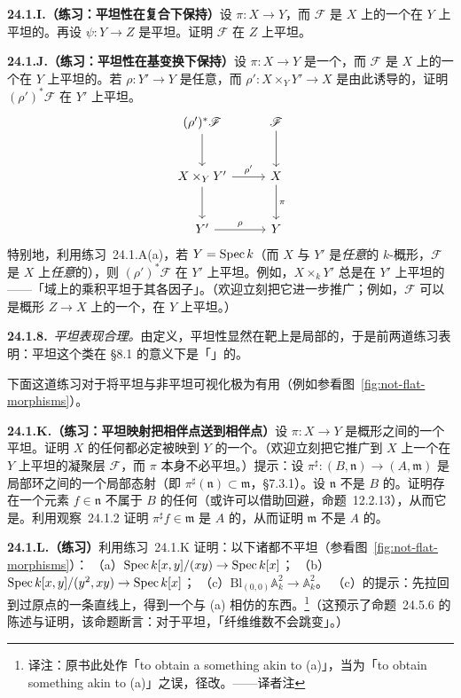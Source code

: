 \textbf{24.1.I.（练习：平坦性在复合下保持）}\quad 设 $\pi\colon X\to Y$，而 $\mathscr{F}$ 是 $X$ 上的一个在 $Y$ 上平坦的\trQCSheaf。再设 $\psi\colon Y\to Z$ 是平坦\trMorphism。证明 $\mathscr{F}$ 在 $Z$ 上平坦。

\textbf{24.1.J.（练习：平坦性在基变换下保持）}\quad 设 $\pi\colon X\to Y$ 是一个\trMorphism，而 $\mathscr{F}$ 是 $X$ 上的一个在 $Y$ 上平坦的\trQCSheaf。若 $\rho\colon Y'\to Y$ 是任意\trMorphism，而 $\rho'\colon X\times_Y Y'\to X$ 是由此诱导的\trMorphism，证明 $(\rho')^{*}\mathscr{F}$ 在 $Y'$ 上平坦。
\[
\begin{tikzcd}[row sep=2.6em, column sep=2.6em]
(\rho')^{*}\mathscr{F} \ar[d] & \mathscr{F} \ar[d] \\
X\times_Y Y' \ar[r, "\rho'"] \ar[d] & X \ar[d, "\pi"] \\
Y' \ar[r, "\rho"] & Y
\end{tikzcd}
\]
特别地，利用\mbox{练习~24.1.A}(a)，若 $Y=\operatorname{Spec} k$（而 $X$ 与 $Y'$ 是\emph{任意}的 $k$-概形，$\mathscr{F}$ 是 $X$ 上\emph{任意}的\trQCSheaf），则 $(\rho')^{*}\mathscr{F}$ 在 $Y'$ 上平坦。例如，$X\times_k Y'$ 总是在 $Y'$ 上平坦的——「域上的乘积平坦于其各因子」。（欢迎立刻把它进一步推广；例如，$\mathscr{F}$ 可以是概形 $Z\to X$ 上的一个\trQCSheaf，在 $Y$ 上平坦。）

\textbf{24.1.8.}\ \emph{平坦\trMorphism{}表现合理。}\quad 由定义，平坦性显然在靶上是局部的，于是前两道练习表明：平坦\trMorphism{}这个类在 \S8.1 的意义下是「\trReasonable」的。

下面这道练习对于将平坦与非平坦可视化极为有用（例如参看图~\ref{fig:not-flat-morphisms}）。

\textbf{24.1.K.（练习：平坦映射把相伴点送到相伴点）}\quad 设 $\pi\colon X\to Y$ 是\trLocally\trNoether{}概形之间的一个平坦\trMorphism。证明 $X$ 的任何\trAssociatedPoint{}都必定被映到 $Y$ 的一个\trAssociatedPoint。（欢迎立刻把它推广到 $X$ 上一个在 $Y$ 上平坦的凝聚层 $\mathscr{F}$，而 $\pi$ 本身不必平坦。）提示：设 $\pi^{\sharp}\colon(B,\mathfrak{n})\to(A,\mathfrak{m})$ 是\trNoether{}局部环之间的一个局部态射（即 $\pi^{\sharp}(\mathfrak{n})\subset\mathfrak{m}$，\S7.3.1）。设 $\mathfrak{n}$ 不是 $B$ 的\trAssociatedPrimeIdeal。证明存在一个元素 $f\in\mathfrak{n}$ 不属于 $B$ 的任何\trAssociatedPrimeIdeal（或许可以借助\trPrimeIdeal{}回避，\mbox{命题~12.2.13}），从而它是\trNonZerodivisor。利用\mbox{观察~24.1.2} 证明 $\pi^{\sharp}f\in\mathfrak{m}$ 是 $A$ 的\trNonZerodivisor，从而证明 $\mathfrak{m}$ 不是 $A$ 的\trAssociatedPrimeIdeal。

\textbf{24.1.L.（练习）}\quad 利用\mbox{练习~24.1.K} 证明：以下诸\trMorphism{}都不平坦（参看图~\ref{fig:not-flat-morphisms}）：
（a）$\operatorname{Spec} k[x,y]/(xy)\to\operatorname{Spec} k[x]$；
（b）$\operatorname{Spec} k[x,y]/(y^{2},xy)\to\operatorname{Spec} k[x]$；
（c）$\mathrm{Bl}_{(0,0)}\mathbb{A}^{2}_k\to\mathbb{A}^{2}_k$。
（c）的提示：先拉回到过原点的一条直线上，得到一个与 (a) 相仿的东西。\footnote{译注：原书此处作「to obtain a something akin to (a)」，当为「to obtain something akin to (a)」之误，径改。——译者注}（这预示了\mbox{命题~24.5.6} 的陈述与证明，该命题断言：对于平坦\trMorphism{}，「纤维维数不会跳变」。）

